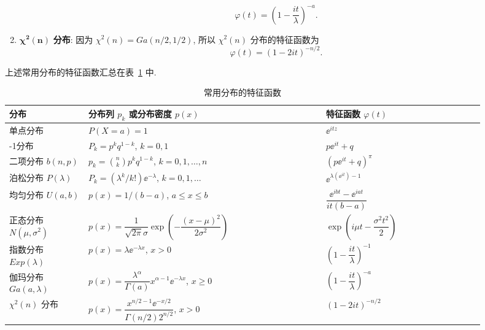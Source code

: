 \begin{example}
\begin{enumerate}
        \begin{equation*}
            \varphi(t) = \left( 1 - \frac{it}{\lambda} \right)^{-a}.
        \end{equation*}
        \item
        $ \mathbf{\chi^2 (n)} $ \textbf{分布}: 因为 $ \chi^2 (n) = Ga ( n/2, 1/2 ) $, 所以 $ \chi^2 (n) $ 分布的特征函数为
        \begin{equation*}
            \varphi (t) = ( 1 - 2it )^{-n/2}.
        \end{equation*}
    \end{enumerate}
\end{example}

上述常用分布的特征函数汇总在表~\ref{tab:4.1.1} 中.

\begin{table}
    \renewcommand{\arraystretch}{1.6}
    \centering
    \caption{常用分布的特征函数}\label{tab:4.1.1}
    \begin{tabular}{>{\centering\arraybackslash}m{0.15\linewidth}>{\centering\arraybackslash}m{0.45\linewidth}>{\centering\arraybackslash}m{0.3\linewidth}}
        \toprule
        分布 & 分布列 $ p_k $ 或分布密度 $ p (x) $ & 特征函数 $ \varphi (t) $\\
        \midrule
        单点分布 & $ P (X = a) = 1 $ & $ \ee^{itz} $\\
        0-1分布 & $ P_k = p^k  q^{1 - k} $, $ k = 0,1 $ & $ p \ee^{it} + q $\\
        二项分布 $ b (n, p) $ & $ p_k = \binom{n}{k} p^k q^{1-k} $, $ k = 0,1,\dotsc,n $ & $ \left( p \ee^{it} + q \right)^{\pi} $\\
        泊松分布 $ P (\lambda) $ & $ P_k = ( \lambda^k/k! ) \ee^{-\lambda} $, $ k = 0, 1, \dotsc $ & $ \ee^{\lambda ( \ee^{it} ) -1} $\\
        均匀分布 $ U (a,b) $ & $ p (x) = 1/(b-a) $, $ a \leq x \leq b $ & $ \dfrac{\ee^{ibt} - \ee^{iat}}{it (b-a)} $\\
        正态分布 $ N (\mu, \sigma^2) $ & $ p (x) = \dfrac{1}{\sqrt{2\pi}\sigma} \exp \left( - \dfrac{( x - \mu )^2}{2 \sigma^2} \right) $ & $ \exp \left( i \mu t - \dfrac{\sigma^2 t^2}{2} \right) $\\
        指数分布 $ Exp ( \lambda ) $ & $ p (x) = \lambda \ee^{-\lambda x} $, $ x > 0 $ & $ \left( 1 - \dfrac{it}{\lambda} \right)^{-1} $\\
        伽玛分布 $ Ga ( a, \lambda ) $ & $ p (x) = \dfrac{\lambda^\alpha}{\Gamma (a)} x^{\alpha - 1} \ee^{-\lambda x} $, $ x \geq 0 $ & $ \left( 1 - \dfrac{it}{\lambda} \right)^{-a} $\\
        $ \chi^2 (n) $ 分布 & $ p (x) = \dfrac{x^{n/2 - 1} \ee^{-x/2}}{\Gamma (n/2) 2^{n/2}} $, $ x > 0 $ & $ ( 1 - 2it )^{-n/2} $\\
        \bottomrule
    \end{tabular}
\end{table}

